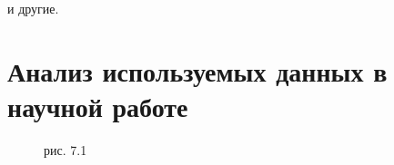 \documentclass{article}
\begin{document}
\vspace{0.5cm}
и другие.

\newpage

\section{Анализ используемых данных в научной работе}

\begin{figure}[H]
\begin{minipage}[h]{0.41\linewidth}
 рис. 7.1 \\
\end{minipage}
\hfill
\begin{minipage}[h]{0.41\linewidth}

\end{minipage}
\end{figure}
\end{document}
